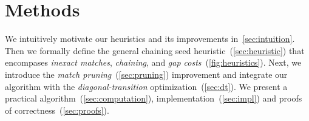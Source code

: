 \section{Methods} \label{sec:methods}

We intuitively motivate our \A heuristics and its improvements
in~\cref{sec:intuition}. Then we formally define the general chaining seed
heuristic~(\cref{sec:heuristic}) that encompases \emph{inexact matches},
\emph{chaining}, and \emph{gap costs}~(\cref{fig:heuristics}). Next, we
introduce the \emph{match pruning}~(\cref{sec:pruning}) improvement and
integrate our \A algorithm with the \emph{diagonal-transition}
optimization~(\cref{sec:dt}). We present a practical
algorithm~(\cref{sec:computation}), implementation~(\cref{sec:impl}) and
proofs of correctness~(\cref{sec:proofs}).






